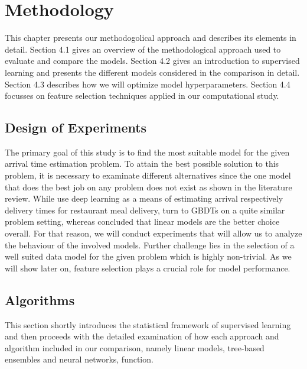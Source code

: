 

\chapter{Methodology}
This chapter presents our methodogolical approach and describes its elements in detail.
Section 4.1 gives an overview of the methodological approach used to evaluate and compare the models. 
Section 4.2 gives an introduction to supervised learning and presents the different models considered in the comparison in detail.
Section 4.3 describes how we will optimize model hyperparameters. 
Section 4.4 focusses on feature selection techniques applied in our computational study.

\section{Design of Experiments}

The primary goal of this study is to find the most suitable model for the given arrival time estimation problem. To attain the best possible solution to this problem, it is necessary to examinate different alternatives since the one model that does the best job on any problem does not exist as shown in the literature review. While \cite{Zhu2020_OFCTE_DL} use deep learning as a means of estimating arrival respectively delivery times for restaurant meal delivery, \cite{Hildebrandt2020_EAT} turn to GBDTs on a quite similar problem setting, whereas \cite{Liu2018_LM_PLM} concluded that linear models are the better choice overall. For that reason, we will conduct experiments that will allow us to analyze the behaviour of the involved models.
Further challenge lies in the selection of a well suited data model for the given problem which is highly non-trivial. 
As we will show later on, feature selection plays a crucial role for model performance.

\section{Algorithms}

This section shortly introduces the statistical framework of supervised learning and then proceeds with the detailed examination of how each approach and algorithm included in our comparison, namely linear models, tree-based ensembles and neural networks, function. 

